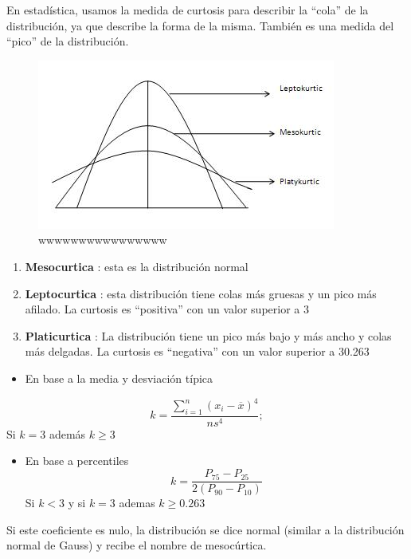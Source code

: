 \documentclass[
  11pt,
]{krantz}
\providecommand{\tightlist}{%
  \setlength{\itemsep}{0pt}\setlength{\parskip}{0pt}}
\theoremstyle{definition}
\theoremstyle{definition}
\theoremstyle{definition}
\theoremstyle{definition}
\theoremstyle{remark}
\begin{document}
En estadística, usamos la medida de curtosis para describir la ``cola'' de la distribución, ya que describe la forma de la misma. También es una medida del ``pico'' de la distribución.

\begin{figure}
\centering
\includegraphics{curtosis.jpg}
\caption{wwwwwwwwwwwwwwww}
\end{figure}

\begin{enumerate}
\def\labelenumi{\arabic{enumi}.}
\tightlist
\item
  \textbf{Mesocurtica} : esta es la distribución normal
\item
  \textbf{Leptocurtica} : esta distribución tiene colas más gruesas y un pico más afilado. La curtosis es ``positiva'' con un valor superior a 3
\item
  \textbf{Platicurtica} : La distribución tiene un pico más bajo y más ancho y colas más delgadas. La curtosis es ``negativa'' con un valor superior a 30.263
\end{enumerate}

\begin{itemize}
\tightlist
\item
  En base a la media y desviación típica
\end{itemize}

\[k= \frac{\sum_{i=1}^{n}\left( x_i-\overline{x}\right)^4 }{ns^4};\] Si \(k=3\) además \(k\geq 3\)

\begin{itemize}
\tightlist
\item
  En base a percentiles
  \[k= \frac{P_{75}-P_{25}}{2\left( P_{90}-P_{10} \right) }\] Si \(k<3\) y si \(k=3\) ademas \(k\geq 0.263\)
\end{itemize}

Si este coeficiente es nulo, la distribución se dice normal (similar a la distribución normal de Gauss) y recibe el nombre de mesocúrtica.
\end{document}
